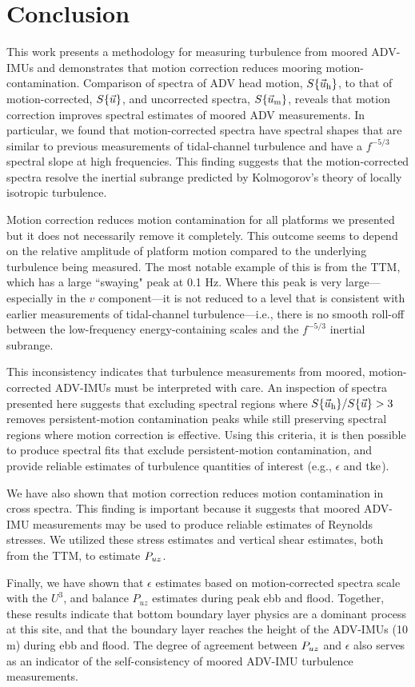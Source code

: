 
\section{Conclusion}
\label{sec:conclusion}
 
This work presents a methodology for measuring turbulence from moored ADV-IMUs and demonstrates that motion correction reduces mooring motion-contamination. Comparison of spectra of ADV head motion, $S\{\vec{u}_\mathrm{h}\}$, to that of motion-corrected, $S\{\vec{u}\}$, and uncorrected spectra, $S\{\vec{u}_\mathrm{m}\}$, reveals that motion correction improves spectral estimates of moored ADV measurements. In particular, we found that motion-corrected spectra have spectral shapes that are similar to previous measurements of tidal-channel turbulence and have a $f^{-5/3}$ spectral slope at high frequencies. This finding suggests that the motion-corrected spectra resolve the inertial subrange predicted by Kolmogorov's theory of locally isotropic turbulence.

Motion correction reduces motion contamination for all platforms we presented but it does not necessarily remove it completely. This outcome seems to depend on the relative amplitude of platform motion compared to the underlying turbulence being measured. The most notable example of this is from the TTM, which has a large ``swaying" peak at 0.1 Hz. Where this peak is very large---especially in the $v$ component---it is not reduced to a level that is consistent with earlier measurements of tidal-channel turbulence---i.e., there is no smooth roll-off between the low-frequency energy-containing scales and the $f^{-5/3}$ inertial subrange.

This inconsistency indicates that turbulence measurements from moored, motion-corrected ADV-IMUs must be interpreted with care. An inspection of spectra presented here suggests that excluding spectral regions where $S\{\vec{u}_\mathrm{h}\} / S\{\vec{u}\} > 3$ removes persistent-motion contamination peaks while still preserving spectral regions where motion correction is effective. Using this criteria, it is then possible to produce spectral fits that exclude persistent-motion contamination, and provide reliable estimates of turbulence quantities of interest (e.g., $\epsilon$ and $\mathrm{tke}$).

We have also shown that motion correction reduces motion contamination in cross spectra. This finding is important because it suggests that moored ADV-IMU measurements may be used to produce reliable estimates of Reynolds stresses. We utilized these stress estimates and vertical shear estimates, both from the TTM, to estimate $P_{uz}$. 

Finally, we have shown that $\epsilon$ estimates based on motion-corrected spectra scale with the $U^3$, and balance $P_{uz}$ estimates during peak ebb and flood. Together, these results indicate that bottom boundary layer physics are a dominant process at this site, and that the boundary layer reaches the height of the ADV-IMUs (10 m) during ebb and flood. The degree of agreement between $P_{uz}$ and $\epsilon$ also serves as an indicator of the self-consistency of moored ADV-IMU turbulence measurements. 

